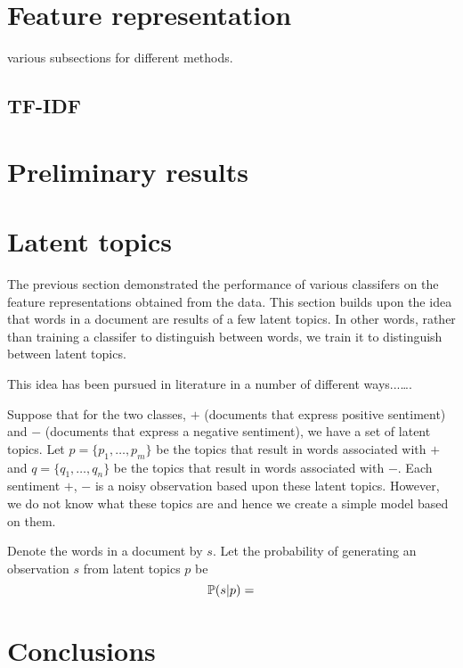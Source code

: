 \documentclass[10pt, letterpaper, conference, final, twocolumn]{ieeeconf}
\begin{document}
\section{Feature representation}
\label{sec:features}

various subsections for different methods.
\subsection{TF-IDF}
\label{ssec:tfidf}

\section{Preliminary results}
\label{sec:prelim}

\section{Latent topics}
\label{sec:latent}

The previous section demonstrated the performance of various classifers on the feature representations obtained from the data. This section builds upon the idea that words in a document are results of a few latent topics. In other words, rather than training a classifer to distinguish between words, we train it to distinguish between latent topics.

This idea has been pursued in literature in a number of different ways...\ldots.

Suppose that for the two classes, $+$ (documents that express positive sentiment) and $-$ (documents that express a negative sentiment), we have a set of latent topics. Let $p = \{ p_1, \ldots, p_m \}$ be the topics that result in words associated with $+$ and $q = \{ q_1, \ldots, q_n \}$ be the topics that result in words associated with $-$. Each sentiment $+$, $-$ is a noisy observation based upon these latent topics. However, we do not know what these topics are and hence we create a simple model based on them.

Denote the words in a document by $s$. Let the probability of generating an observation $s$ from latent topics $p$ be
$$
\mathbb{P}(s | p) = 
$$

\section{Conclusions}
\label{sec:conclusions}



\end{document}
